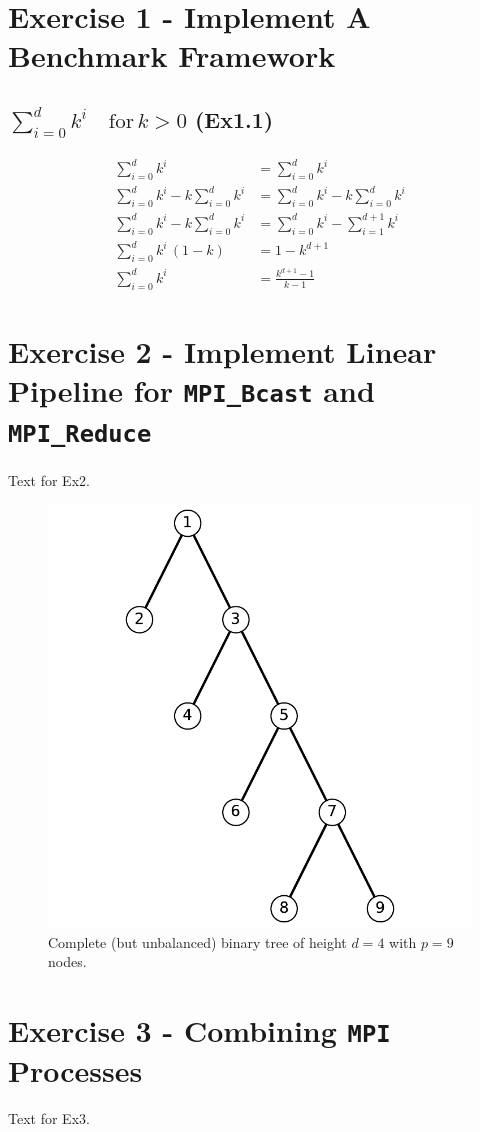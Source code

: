 \section{Exercise 1 - Implement A Benchmark Framework}
\subsection{$\sum_{i=0}^d k^i \quad \mathrm{for } \, k>0$ (Ex1.1)}
\begin{equation}
\begin{aligned}
    \sum_{i=0}^d k^i &= \sum_{i=0}^d k^i \\
    \sum_{i=0}^d k^i - k \sum_{i=0}^d k^i &= \sum_{i=0}^d k^i - k \sum_{i=0}^d k^i \\
    \sum_{i=0}^d k^i - k \sum_{i=0}^d k^i &= \sum_{i=0}^d k^i - \sum_{i=1}^{d+1} k^i \\
    \sum_{i=0}^d k^i \, (1-k) &= 1 - k^{d+1}\\
    \sum_{i=0}^d k^i   &=  \frac{k^{d+1} - 1}{k-1}
    \label{closedForm_Ex1.1}
\end{aligned}
\end{equation}

\pagebreak

\section{Exercise 2 - Implement Linear Pipeline for \texttt{MPI\_Bcast} and \texttt{MPI\_Reduce}}

Text for Ex2.
\begin{figure}[h]
    \begin{center}
        \includegraphics[width=0.3\linewidth]{figures/Ex1_2_c.pdf}
        \caption{Complete (but unbalanced) binary tree of height $d = 4$ with $p = 9$ nodes.}
    \end{center}
\end{figure}
\pagebreak


\section{Exercise 3 - Combining \texttt{MPI} Processes}
Text for Ex3.
\pagebreak

